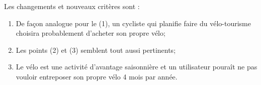 \documentclass[12pt]{article}
\begin{document}
\medskip

 Les changements et nouveaux crit\`eres sont : 
\begin{enumerate}
    \item De fa\c con analogue pour le (1), un cycliste qui planifie faire du v\'elo-tourisme
        choisira probablement d'acheter son propre v\'elo;
    \item Les points (2) et (3) semblent tout aussi pertinents;
    \item Le v\'elo est une activit\'e d'avantage saisonni\`ere
        et un utilisateur poura\^it ne pas vouloir entreposer son propre v\'elo 4 mois par ann\'ee.
\end{enumerate}
\end{document}
